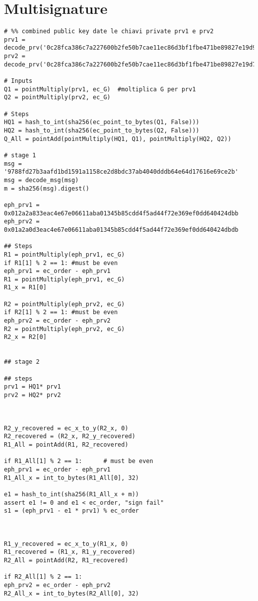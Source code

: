 \chapter{Multisignature}
\label{appendiceA}
\thispagestyle{empty}

\noindent 
\begin{verbatim}
# %% combined public key date le chiavi private prv1 e prv2
prv1 = decode_prv('0c28fca386c7a227600b2fe50b7cae11ec86d3bf1fbe471be89827e19d92ad1d')
prv2 = decode_prv('0c28fca386c7a227600b2fe50b7cae11ec86d3bf1fbe471be89827e19d72aa1d')

# Inputs
Q1 = pointMultiply(prv1, ec_G)  #moltiplica G per prv1
Q2 = pointMultiply(prv2, ec_G)

# Steps
HQ1 = hash_to_int(sha256(ec_point_to_bytes(Q1, False)))
HQ2 = hash_to_int(sha256(ec_point_to_bytes(Q2, False)))
Q_All = pointAdd(pointMultiply(HQ1, Q1), pointMultiply(HQ2, Q2))

# stage 1
msg = '9788fd27b3aafd1bd1591a1158ce2d8bdc37ab4040dddb64e64d17616e69ce2b'
msg = decode_msg(msg)
m = sha256(msg).digest()

eph_prv1 = 0x012a2a833eac4e67e06611aba01345b85cdd4f5ad44f72e369ef0dd640424dbb
eph_prv2 = 0x01a2a0d3eac4e67e06611aba01345b85cdd4f5ad44f72e369ef0dd640424dbdb

## Steps
R1 = pointMultiply(eph_prv1, ec_G)
if R1[1] % 2 == 1: #must be even
eph_prv1 = ec_order - eph_prv1 
R1 = pointMultiply(eph_prv1, ec_G)
R1_x = R1[0]

R2 = pointMultiply(eph_prv2, ec_G)
if R2[1] % 2 == 1: #must be even
eph_prv2 = ec_order - eph_prv2
R2 = pointMultiply(eph_prv2, ec_G)
R2_x = R2[0]


## stage 2

## steps
prv1 = HQ1* prv1
prv2 = HQ2* prv2



R2_y_recovered = ec_x_to_y(R2_x, 0)   
R2_recovered = (R2_x, R2_y_recovered)
R1_All = pointAdd(R1, R2_recovered)

if R1_All[1] % 2 == 1:      # must be even
eph_prv1 = ec_order - eph_prv1
R1_All_x = int_to_bytes(R1_All[0], 32)

e1 = hash_to_int(sha256(R1_All_x + m))
assert e1 != 0 and e1 < ec_order, "sign fail"
s1 = (eph_prv1 - e1 * prv1) % ec_order



R1_y_recovered = ec_x_to_y(R1_x, 0)
R1_recovered = (R1_x, R1_y_recovered)
R2_All = pointAdd(R2, R1_recovered)

if R2_All[1] % 2 == 1:
eph_prv2 = ec_order - eph_prv2
R2_All_x = int_to_bytes(R2_All[0], 32)


\end{verbatim}
